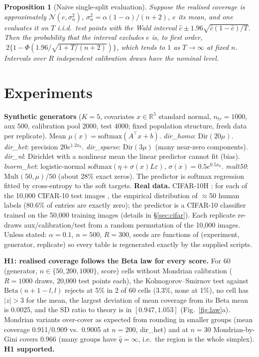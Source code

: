 \documentclass{article}
\newtheorem{proposition}{Proposition}
\begin{document}
\begin{proposition}[Naive single-split evaluation]\label{prop:naive}
Suppose the realised coverage is approximately $\mathcal N(e,\sigma_n^2)$, $\sigma_n^2=\alpha(1-\alpha)/(n+2)$, $e$ its mean, and one evaluates it on $T$ i.i.d.\ test points with the Wald interval $\hat c\pm1.96\sqrt{\hat c(1-\hat c)/T}$. Then the probability that the interval excludes $e$ is, to first order,
$\;2\{1-\Phi(1.96/\sqrt{1+T/(n+2)})\}$, which tends to $1$ as $T\to\infty$ at fixed $n$. Intervals over $R$ independent calibration draws have the nominal level.
\end{proposition}

\section{Experiments}\label{sec:exp}
\textbf{Synthetic generators} ($K=5$, covariates $x\in\mathbb R^5$ standard normal, $n_{tr}=1000$, aux $500$, calibration pool $2000$, test $4000$; fixed population structure, fresh data per replicate). Mean $\mu(x)=\mathrm{softmax}(A^\top x+b)$. \emph{dir\_homo}: $\mathrm{Dir}(20\mu)$. \emph{dir\_het}: precision $20e^{1.2x_0}$. \emph{dir\_sparse}: $\mathrm{Dir}(3\mu)$ (many near-zero components). \emph{dir\_nl}: Dirichlet with a nonlinear mean the linear predictor cannot fit (bias). \emph{lnorm\_het}: logistic-normal $\mathrm{softmax}(\eta+\sigma(x)L\varepsilon)$, $\sigma(x)=0.5e^{0.5x_0}$. \emph{mult50}: $\mathrm{Mult}(50,\mu)/50$ (about 28\% exact zeros). The predictor is softmax regression fitted by cross-entropy to the soft targets. \textbf{Real data.} CIFAR-10H \citep{peterson2019human}: for each of the 10{,}000 CIFAR-10 test images \citep{krizhevsky2009learning}, the empirical distribution of $\approx$50 human labels ($80.6\%$ of entries are exactly zero); the predictor is a CIFAR-10 classifier trained on the 50{,}000 training images (details in \S\ref{sec:cifar}). Each replicate re-draws aux/calibration/test from a random permutation of the 10{,}000 images. Unless stated: $\alpha=0.1$, $n=500$, $R=300$, seeds are functions of (experiment, generator, replicate) so every table is regenerated exactly by the supplied scripts.

\textbf{H1: realised coverage follows the Beta law for every score.} For 60 (generator, $n\in\{50,200,1000\}$, score) cells without Mondrian calibration ($R=1000$ draws, 20{,}000 test points each), the Kolmogorov--Smirnov test against $\mathrm{Beta}(n+1-l,l)$ rejects at 5\% in 2 of 60 cells (3.3\%, none at 1\%), no cell has $|z|>3$ for the mean, the largest deviation of mean coverage from its Beta mean is 0.0025, and the SD ratio to theory is in $[0.947,1.053]$ (Fig.~\ref{fig:law}a). Mondrian variants over-cover as expected from rounding in smaller groups (mean coverage 0.911/0.909 vs.\ 0.9005 at $n=200$, dir\_het) and at $n=30$ Mondrian-by-Gini covers 0.966 (many groups have $\hat q=\infty$, i.e.\ the region is the whole simplex). \textbf{H1 supported.}
\end{document}
